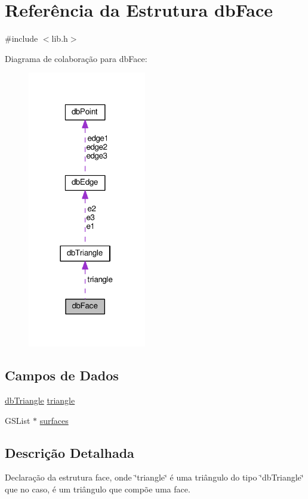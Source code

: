 \hypertarget{structdbFace}{}\section{Referência da Estrutura db\+Face}
\label{structdbFace}


{\ttfamily \#include $<$lib.\+h$>$}



Diagrama de colaboração para db\+Face\+:
\nopagebreak
\begin{figure}[H]
\begin{center}
\leavevmode
\includegraphics[width=146pt]{structdbFace__coll__graph}
\end{center}
\end{figure}
\subsection*{Campos de Dados}
\begin{DoxyCompactItemize}
\item 
\hyperlink{structdbTriangle}{db\+Triangle} \hyperlink{structdbFace_a1600f7dbf1d0654be251c20dc049837c}{triangle}
\item 
G\+S\+List $\ast$ \hyperlink{structdbFace_a6018f19ec73ee7aa43998a9d763c635f}{surfaces}
\end{DoxyCompactItemize}


\subsection{Descrição Detalhada}
Declaração da estrutura face, onde \char`\"{}triangle\char`\"{} é uma triângulo do tipo \char`\"{}db\+Triangle\char`\"{} que no caso, é um triângulo que compõe uma face. 

